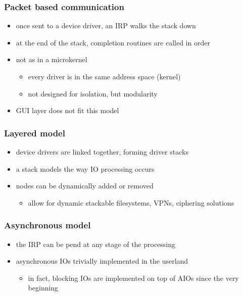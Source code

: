 
\begin{frame}
 \frametitle{Packet based communication}
 \begin{itemize}
  \item
    once sent to a device driver, an IRP walks the stack down
  \item
    at the end of the stack, completion routines are called in order
  \item
    not as in a microkernel
    \begin{itemize}
      \item
        every driver is in the same address space (kernel)
      \item
        not designed for isolation, but modularity
    \end{itemize}
  \item
    GUI layer does not fit this model
 \end{itemize}
\end{frame}


\begin{frame}
 \frametitle{Layered model}
 \begin{itemize}
   \item
     device drivers are linked together, forming driver stacks
   \item
     a stack models the way IO processing occurs
   \item
     nodes can be dynamically added or removed
     \begin{itemize}
       \item
         allow for dynamic stackable filesystems, VPNs, ciphering solutions
     \end{itemize}
 \end{itemize}
\end{frame}


\begin{frame}
 \frametitle{Asynchronous model}
 \begin{itemize}
   \item
     the IRP can be pend at any stage of the processing
   \item
     asynchronous IOs trivially implemented in the userland
     \begin{itemize}
       \item
         in fact, blocking IOs are implemented on top of AIOs since the very beginning
     \end{itemize}
 \end{itemize}
\end{frame}



